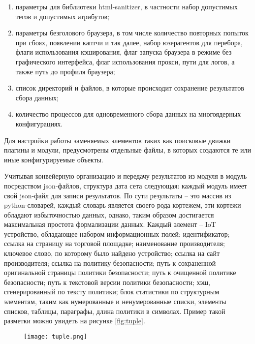 \documentclass[../main]{subfiles}
\begin{document}
\begin{enumerate}
    \item параметры для библиотеки html-sanitizer, в частности набор допустимых тегов и допустимых атрибутов;
    \item параметры безголового браузера, в том числе количество повторных попыток при сбоях, появлении каптчи и так далее, набор юзерагентов для перебора, флаги использования кэширования, флаг запуска браузера в режиме без графического интерфейса, флаг использования прокси, пути для логов, а также путь до профиля браузера;
    \item список директорий и файлов, в которые происходит сохранение результатов сбора данных;
    \item количество процессов для одновременного сбора данных на многоядерных конфигурациях.
\end{enumerate}

Для настройки работы заменяемых элементов таких как поисковые движки плагины и модули, предусмотрены отдельные файлы, в которых создаются те или иные конфигурируемые объекты.

Учитывая конвейерную организацию и передачу результатов из модуля в модуль посредством json-файлов, структура дата сета следующая: каждый модуль имеет свой json-файл для записи результатов. По сути результаты – это массив из python-словарей, каждый словарь является своего рода кортежем, эти кортежи обладают избыточностью данных, однако, таким образом достигается максимальная простота формализации данных. Каждый элемент – IoT устройство, обладающее набором информационных полей: идентификатор; ссылка на страницу на торговой площадке; наименование производителя; ключевое слово, по которому было найдено устройство; ссылка на сайт производителя; ссылка на политику безопасности; путь к сохраненной оригинальной страницы политики безопасности; путь к очищенной политике безопасности; путь к текстовой версии политики безопасности; хэш, сгенерированный по тексту политики; блок статистики по структурным элементам, таким как нумерованные и ненумерованные списки, элементы списков, таблицы, параграфы, длина политики в символах. Пример такой разметки можно увидеть на рисунке \ref{fig:tuple}.

\begin{figure}[H]
    \centering
    {\texttt{[image: tuple.png]}}
    \vspace{-\baselineskip}
\end{figure}
\end{document}
